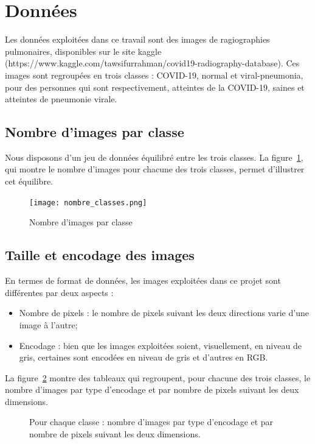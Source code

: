 \documentclass[11pt,twoside,openright]{article}
\begin{document}
\section{Données}

Les données exploitées dans ce travail sont des images de ragiographies pulmonaires, disponibles sur le site kaggle (https://www.kaggle.com/tawsifurrahman/covid19-radiography-database). Ces images sont regroupées en trois classes : COVID-19, normal et viral-pneumonia, pour des personnes qui sont respectivement, atteintes de la COVID-19, saines et atteintes de pneumonie virale.  

\subsection{Nombre d'images par classe}

Nous disposons d'un jeu de données équilibré entre les trois classes. La figure~\ref{fig:nb_classes}, qui montre le nombre d'images pour chacune des trois classes, permet d'illustrer cet équilibre. 

\begin{figure}[htbp]
\centering
\texttt{[image: nombre\_classes.png]}
\caption{Nombre d'images par classe}
\label{fig:nb_classes}
\end{figure}

\subsection{Taille et encodage des images}
En termes de format de données, les images exploitées dans ce projet sont différentes par deux aspects :
\begin{itemize}
    \item Nombre de pixels : le nombre de pixels suivant les deux directions varie d'une image à l'autre;
    \item Encodage : bien que les images exploitées soient, visuellement, en niveau de gris, certaines sont encodées en niveau de gris et d'autres en RGB. 
\end{itemize}

La figure~\ref{fig:im_size_enc} montre des tableaux qui regroupent, pour chacune des trois classes, le nombre d'images par type d'encodage et par nombre de pixels suivant les deux dimensions.

\begin{figure}[htbp]
  \centering
  \caption{Pour chaque classe : nombre d'images par type d'encodage et par nombre de pixels suivant les deux dimensions.}
  \label{fig:im_size_enc}
\end{figure}
\end{document}
